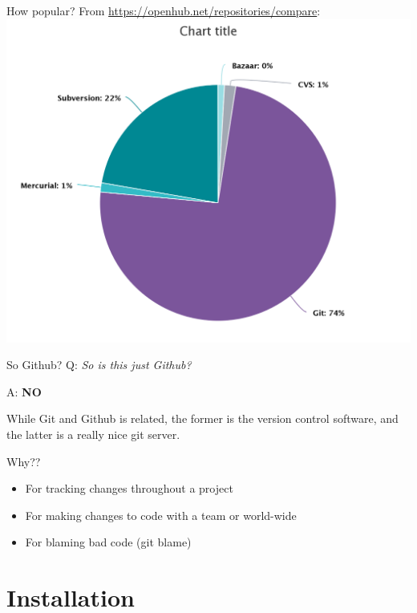 \begin{frame}{How popular?}
    From \url{https://openhub.net/repositories/compare}:
    \centering \includegraphics[height=0.8\textheight]{eimg/gitpop.png}
\end{frame}

\begin{frame}{So Github?}
    Q: \textit{So is this just Github?} \pause

    A: \textbf{NO}

    \vspace{2em}
    While Git and Github is related, the former is the version control software, and the latter is a really nice git server.
\end{frame}

\begin{frame}{Why??}
    \begin{itemize}[<+->]
        \item For tracking changes throughout a project
        \item For making changes to code with a team or world-wide
        \item For blaming bad code (git blame)
    \end{itemize}
\end{frame}

\section{Installation}

